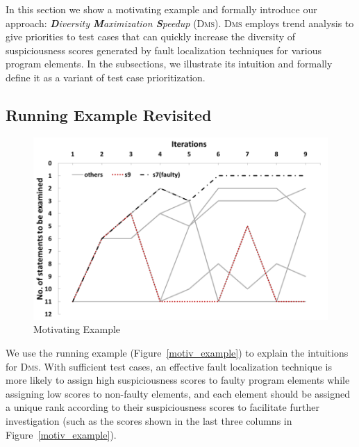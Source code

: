 
In this section we show a motivating example and formally introduce our approach: {\em \textbf{D}iversity \textbf{M}aximization \textbf{S}peedup} (\textsc{Dms}). \textsc{Dms} employs trend analysis to give priorities to test cases that can quickly increase the diversity of suspiciousness scores generated by fault localization techniques for various program elements.
In the subsections, we illustrate its intuition and formally define it as a variant of test case prioritization.

\subsection{Running Example Revisited}\label{sec.motive}



\begin{figure}[tbp]
    \centering
    \includegraphics[width=12cm]{motive_1.png}
    \caption{Motivating Example}
    \label{fig:motive_1}
\end{figure}

We use the running example (Figure~\ref{motiv_example}) to explain the intuitions for
\textsc{Dms}. With sufficient test cases, an effective fault localization technique is more likely to assign high suspiciousness scores to faulty program elements while assigning low scores to non-faulty elements, and each element should be assigned a unique rank according to their suspiciousness scores to facilitate further investigation (such as the scores shown in the last three columns in Figure~\ref{motiv_example}).


